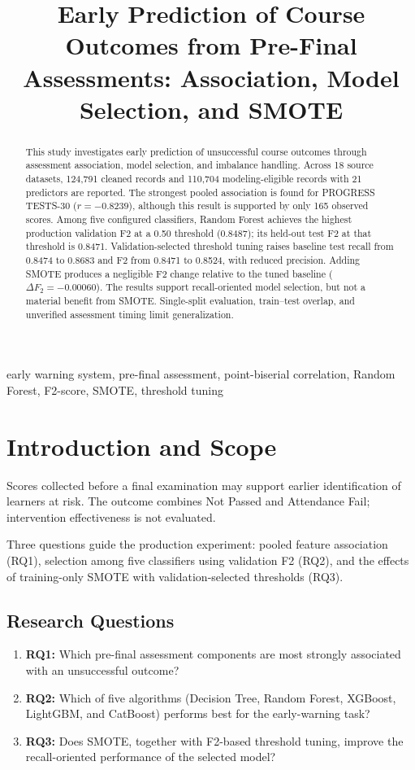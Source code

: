 \documentclass[conference]{IEEEtran}
\title{Early Prediction of Course Outcomes from Pre-Final Assessments: Association, Model Selection, and SMOTE}
\author{\IEEEauthorblockN{Ph\d{a}m Ho\`ang Long\quad L\^e Nguy\'{\^e}n Khang\quad V\~o V\'{\u a}n Ti\'{e}n}
\IEEEauthorblockA{SE211868\quad SE212168\quad SE180541\\
ADY201m -- Applied Data Science}}
\begin{document}
\maketitle
\begin{abstract}
This study investigates early prediction of unsuccessful course outcomes through assessment association, model selection, and imbalance handling. Across 18 source datasets, 124,791 cleaned records and 110,704 modeling-eligible records with 21 predictors are reported. The strongest pooled association is found for PROGRESS TESTS-30 ($r=-0.8239$), although this result is supported by only 165 observed scores. Among five configured classifiers, Random Forest achieves the highest production validation F2 at a 0.50 threshold (0.8487); its held-out test F2 at that threshold is 0.8471. Validation-selected threshold tuning raises baseline test recall from 0.8474 to 0.8683 and F2 from 0.8471 to 0.8524, with reduced precision. Adding SMOTE produces a negligible F2 change relative to the tuned baseline ($\Delta F_2=-0.00060$). The results support recall-oriented model selection, but not a material benefit from SMOTE. Single-split evaluation, train--test overlap, and unverified assessment timing limit generalization.
\end{abstract}
\begin{IEEEkeywords}
early warning system, pre-final assessment, point-biserial correlation, Random Forest, F2-score, SMOTE, threshold tuning
\end{IEEEkeywords}

\section{Introduction and Scope}
Scores collected before a final examination may support earlier identification of learners at risk. The outcome combines Not Passed and Attendance Fail; intervention effectiveness is not evaluated.

Three questions guide the production experiment: pooled feature association (RQ1), selection among five classifiers using validation F2 (RQ2), and the effects of training-only SMOTE with validation-selected thresholds (RQ3).

\subsection{Research Questions}
\begin{enumerate}
\item \textbf{RQ1:} Which pre-final assessment components are most strongly associated with an unsuccessful outcome?
\item \textbf{RQ2:} Which of five algorithms (Decision Tree, Random Forest, XGBoost, LightGBM, and CatBoost) performs best for the early-warning task?
\item \textbf{RQ3:} Does SMOTE, together with F2-based threshold tuning, improve the recall-oriented performance of the selected model?
\end{enumerate}
\end{document}
